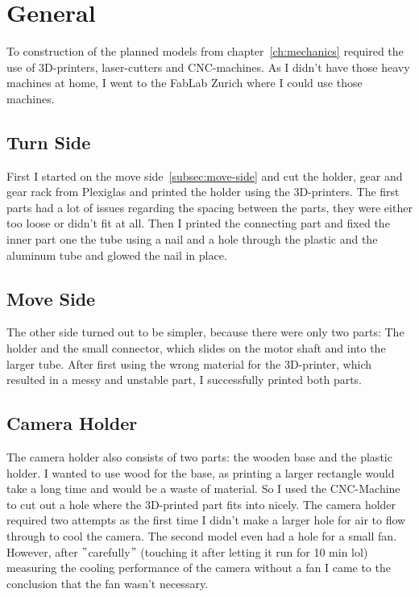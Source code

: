 \section{General}\label{sec:general3}
To construction of the planned models from chapter~\ref{ch:mechanics} required the use of 3D-printers, laser-cutters and CNC-machines.
As I didn't have those heavy machines at home, I went to the FabLab Zurich\autocite{fablab} where I could use those machines.

\subsection{Turn Side}\label{subsec:turn-side2}
First I started on the move side~\ref{subsec:move-side} and cut the holder, gear and gear rack from Plexiglas and printed the holder using the 3D-printers.
The first parts had a lot of issues regarding the spacing between the parts, they were either too loose or didn't fit at all.
Then I printed the connecting part and fixed the inner part one the tube using a nail and a hole through the plastic and the aluminum tube and glowed the nail in place.

\subsection{Move Side}\label{subsec:move-side2}
The other side turned out to be simpler, because there were only two parts: The holder and the small connector, which slides on the motor shaft and into the larger tube.
After first using the wrong material for the 3D-printer, which resulted in a messy and unstable part, I successfully printed both parts.

\subsection{Camera Holder}\label{subsec:camera-holder}
The camera holder also consists of two parts: the wooden base and the plastic holder.
I wanted to use wood for the base, as printing a larger rectangle would take a long time and would be a waste of material.
So I used the CNC-Machine to cut out a hole where the 3D-printed part fits into nicely.
The camera holder required two attempts as the first time I didn't make a larger hole for air to flow through to cool the camera.
The second model even had a hole for a small fan.
However, after \("\)carefully\("\) (touching it after letting it run for 10 min lol) measuring the cooling performance of the camera without a fan I came to the conclusion that the fan wasn't necessary.
